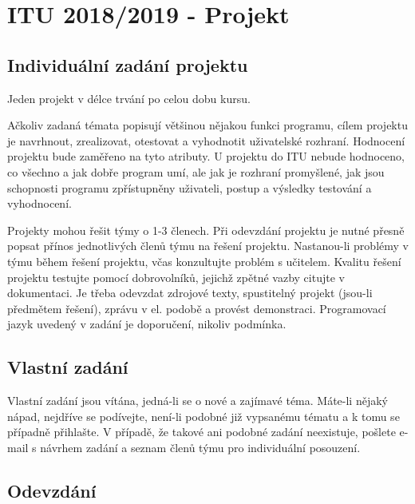 \documentclass[11pt, a4paper, titlepage]{article}
\begin{document}
\section*{ITU 2018/2019 - Projekt}
\bigskip


\subsection*{Individuální zadání projektu}

Jeden projekt v délce trvání po celou dobu kursu.

Ačkoliv zadaná témata popisují většinou nějakou funkci programu, cílem projektu je navrhnout, zrealizovat, otestovat a vyhodnotit uživatelské rozhraní. Hodnocení projektu bude zaměřeno na tyto atributy. U projektu do ITU nebude hodnoceno, co všechno a jak dobře program umí, ale jak je rozhraní promyšlené, jak jsou schopnosti programu zpřístupněny uživateli, postup a výsledky testování a vyhodnocení.

Projekty mohou řešit týmy o 1-3 členech. Při odevzdání projektu je nutné přesně popsat přínos jednotlivých členů týmu na řešení projektu. Nastanou-li problémy v týmu během řešení projektu, včas konzultujte problém s učitelem. Kvalitu řešení projektu testujte pomocí dobrovolníků, jejichž zpětné vazby citujte v dokumentaci. Je třeba odevzdat zdrojové texty, spustitelný projekt (jsou-li předmětem řešení), zprávu v el. podobě a provést demonstraci. Programovací jazyk uvedený v zadání je doporučení, nikoliv podmínka.


\subsection*{Vlastní zadání}

Vlastní zadání jsou vítána, jedná-li se o nové a zajímavé téma. Máte-li nějaký nápad, nejdříve se podívejte, není-li podobné již vypsanému tématu a k tomu se případně přihlašte. V případě, že takové ani podobné zadání neexistuje, pošlete e-mail s návrhem zadání a seznam členů týmu pro individuální posouzení.


\subsection*{Odevzdání}
\end{document}
